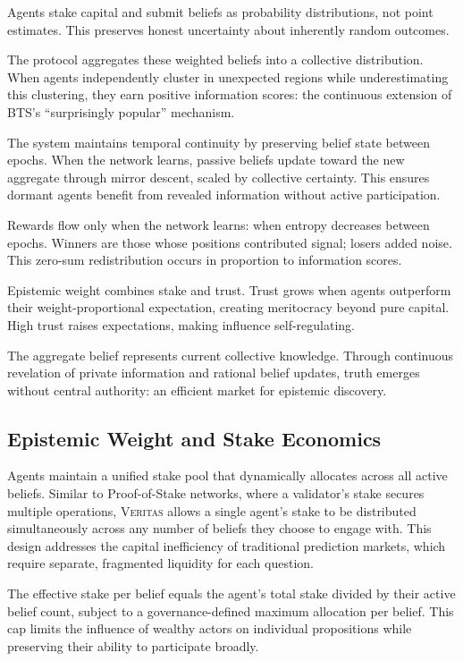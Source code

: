 \documentclass[11pt,a4paper]{article}
\newcommand{\veritas}{\textsc{Veritas}}
\begin{document}
Agents stake capital and submit beliefs as probability distributions, not point estimates. This preserves honest uncertainty about inherently random outcomes.

The protocol aggregates these weighted beliefs into a collective distribution. When agents independently cluster in unexpected regions while underestimating this clustering, they earn positive information scores: the continuous extension of BTS's ``surprisingly popular'' mechanism.

The system maintains temporal continuity by preserving belief state between epochs. When the network learns, passive beliefs update toward the new aggregate through mirror descent, scaled by collective certainty. This ensures dormant agents benefit from revealed information without active participation.

Rewards flow only when the network learns: when entropy decreases between epochs. Winners are those whose positions contributed signal; losers added noise. This zero-sum redistribution occurs in proportion to information scores.

Epistemic weight combines stake and trust. Trust grows when agents outperform their weight-proportional expectation, creating meritocracy beyond pure capital. High trust raises expectations, making influence self-regulating.

The aggregate belief represents current collective knowledge. Through continuous revelation of private information and rational belief updates, truth emerges without central authority: an efficient market for epistemic discovery.

\subsection{Epistemic Weight and Stake Economics}

Agents maintain a unified stake pool that dynamically allocates across all active beliefs. Similar to Proof-of-Stake networks, where a validator's stake secures multiple operations, \veritas{} allows a single agent's stake to be distributed simultaneously across any number of beliefs they choose to engage with. This design addresses the capital inefficiency of traditional prediction markets, which require separate, fragmented liquidity for each question.

The effective stake per belief equals the agent's total stake divided by their active belief count, subject to a governance-defined maximum allocation per belief. This cap limits the influence of wealthy actors on individual propositions while preserving their ability to participate broadly.
\end{document}
